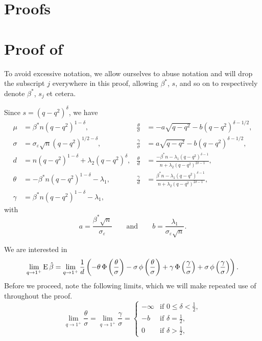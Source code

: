 \section{Proofs}

\section{Proof of }%
\label{sec:classbalance-bias-proof}

To avoid excessive notation, we allow ourselves to abuse notation and will drop the
subscript \(j\) everywhere in this proof, allowing \(\beta^*\), \(s\), and so on to
respectively denote \(\beta^*\), \(s_j\) et cetera.

Since \(s = (q - q^2)^\delta\), we have
\begin{align*}
  \mu    & = \beta^* n (q - q^2)^{1 - \delta},                      & \frac{\theta}{\sigma} & = -a \sqrt{q - q^2} - b (q - q^2)^{\delta - 1/2},                                          \\
  \sigma & = \sigma_\varepsilon \sqrt{n} (q - q^2)^{1/2 - \delta},  & \frac{\gamma}{\sigma} & = a \sqrt{q - q^2} - b (q - q^2)^{\delta - 1/2},                                           \\
  d      & = n (q - q^2)^{1 - \delta} + \lambda_2 (q - q^2)^\delta, & \frac{\theta}{d}      & = \frac{-\beta^*n - \lambda_1 (q - q^2)^{\delta - 1}}{n + \lambda_2(q-q^2)^{2\delta - 1}}, \\
  \theta & = -\beta^* n (q - q^2)^{1-\delta} - \lambda_1,           & \frac{\gamma}{d}      & = \frac{\beta^*n - \lambda_1 (q - q^2)^{\delta - 1}}{n + \lambda_2(q-q^2)^{2\delta - 1}},  \\
  \gamma & = \beta^* n (q - q^2)^{1-\delta} - \lambda_1,
\end{align*}
with
\[
  a = \frac{\beta^* \sqrt{n}}{\sigma_\varepsilon} \qquad \text{and} \qquad b = \frac{\lambda_1}{\sigma_\varepsilon \sqrt{n}}.
\]

We are interested in
\begin{equation}
  \label{eq:eval-qlimit}
  \lim_{q \rightarrow 1^+} \operatorname{E} \hat{\beta} =\lim_{q \rightarrow 1^+}\frac{1}{d}\left(-\theta \operatorname{\Phi}\left(\frac{\theta}{\sigma}\right) - \sigma \operatorname{\phi}\left(\frac{\theta}{\sigma}\right) + \gamma \operatorname{\Phi}\left(\frac{\gamma}{\sigma}\right) + \sigma \operatorname{\phi}\left(\frac{\gamma}{\sigma}\right)\right).
\end{equation}
Before we proceed, note the following limits, which we will make repeated use of throughout the proof.
\begin{equation}
  \label{eq:eval-sigma-limits}
  \lim_{q \rightarrow 1^+} \frac{\theta}{\sigma} = \lim_{q \rightarrow 1^+} \frac{\gamma}{\sigma} =
  \begin{cases}
    -\infty & \text{if } 0 \leq \delta < \frac{1}{2}, \\
    -b      & \text{if } \delta = \frac{1}{2},        \\
    0       & \text{if } \delta > \frac{1}{2},
  \end{cases}
\end{equation}

